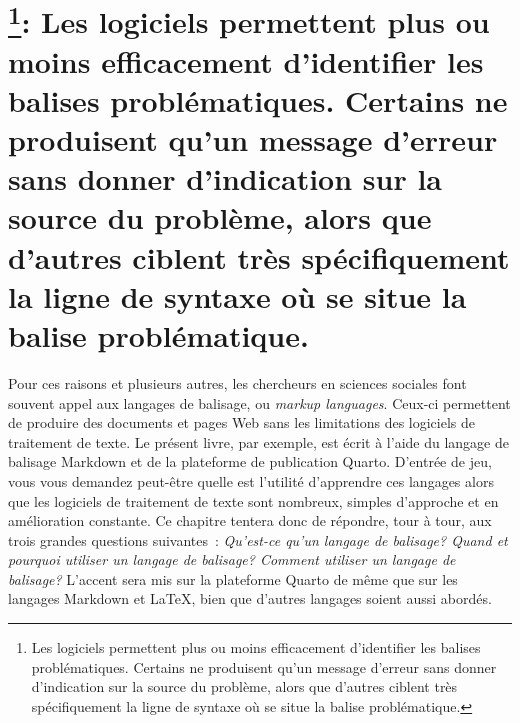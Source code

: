 \documentclass[
  letterpaper,
]{scrbook}
\begin{document}
\hypertarget{chapitre_5-2-les-logiciels-permettent-plus-ou-moins-efficacement-didentifier-les-balises-probluxe9matiques.-certains-ne-produisent-quun-message-derreur-sans-donner-dindication-sur-la-source-du-probluxe8me-alors-que-dautres-ciblent-truxe8s-spuxe9cifiquement-la-ligne-de-syntaxe-ouxf9-se-situe-la-balise-probluxe9matique.}{%
\chapter[: Les logiciels permettent plus ou moins efficacement
d'identifier les balises problématiques. Certains ne produisent qu'un
message d'erreur sans donner d'indication sur la source du problème,
alors que d'autres ciblent très spécifiquement la ligne de syntaxe où se
situe la balise problématique.]{\texorpdfstring{\footnote{Les logiciels
  permettent plus ou moins efficacement d'identifier les balises
  problématiques. Certains ne produisent qu'un message d'erreur sans
  donner d'indication sur la source du problème, alors que d'autres
  ciblent très spécifiquement la ligne de syntaxe où se situe la balise
  problématique.}: Les logiciels permettent plus ou moins efficacement
d'identifier les balises problématiques. Certains ne produisent qu'un
message d'erreur sans donner d'indication sur la source du problème,
alors que d'autres ciblent très spécifiquement la ligne de syntaxe où se
situe la balise
problématique.}{: Les logiciels permettent plus ou moins efficacement d'identifier les balises problématiques. Certains ne produisent qu'un message d'erreur sans donner d'indication sur la source du problème, alors que d'autres ciblent très spécifiquement la ligne de syntaxe où se situe la balise problématique.}}\label{chapitre_5-2-les-logiciels-permettent-plus-ou-moins-efficacement-didentifier-les-balises-probluxe9matiques.-certains-ne-produisent-quun-message-derreur-sans-donner-dindication-sur-la-source-du-probluxe8me-alors-que-dautres-ciblent-truxe8s-spuxe9cifiquement-la-ligne-de-syntaxe-ouxf9-se-situe-la-balise-probluxe9matique.}}

Pour ces raisons et plusieurs autres, les chercheurs en sciences
sociales font souvent appel aux langages de balisage, ou \emph{markup
languages}. Ceux-ci permettent de produire des documents et pages Web
sans les limitations des logiciels de traitement de texte. Le présent
livre, par exemple, est écrit à l'aide du langage de balisage Markdown
et de la plateforme de publication Quarto. D'entrée de jeu, vous vous
demandez peut-être quelle est l'utilité d'apprendre ces langages alors
que les logiciels de traitement de texte sont nombreux, simples
d'approche et en amélioration constante. Ce chapitre tentera donc de
répondre, tour à tour, aux trois grandes questions suivantes~:
\emph{Qu'est-ce qu'un langage de balisage? Quand et pourquoi utiliser un
langage de balisage? Comment utiliser un langage de balisage?} L'accent
sera mis sur la plateforme Quarto de même que sur les langages Markdown
et \LaTeX, bien que d'autres langages soient aussi abordés.
\end{document}
